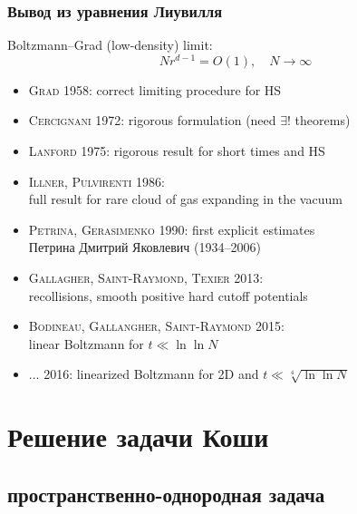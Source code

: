 \documentclass[mathserif]{beamer} %
\newcommand{\OO}[1]{O(#1)}
\newcommand{\Cite}[2][]{\alert{\textsc{#2 #1}}}
\begin{document}
\begin{frame}
    \frametitle{Вывод из уравнения Лиувилля}
    Boltzmann--Grad (low-density) limit: \[ Nr^{d-1}=\OO{1}, \quad N\to\infty \]\vspace{-20pt}
    \begin{itemize}
        \item \Cite[1958]{Grad}: correct limiting procedure for HS
        \item \Cite[1972]{Cercignani}: rigorous formulation (need \(\exists!\) theorems)
        \item \Cite[1975]{Lanford}: rigorous result for short times and HS
        \item \Cite[1986]{Illner, Pulvirenti}:\\ full result for rare cloud of gas expanding in the vacuum
        \item \Cite[1990]{Petrina, Gerasimenko}: first explicit estimates\\
            {\footnotesize Петрина Дмитрий Яковлевич (1934--2006)}
        \item \Cite[2013]{Gallagher, Saint-Raymond, Texier}:\\ recollisions, smooth positive hard cutoff potentials
        \item \Cite[2015]{Bodineau, Gallangher, Saint-Raymond}:\\ linear Boltzmann for \(t\ll\ln\ln N\)
        \item \Cite[2016]{...}: linearized Boltzmann for 2D and \(t\ll\sqrt[4]{\ln\ln N}\)
    \end{itemize}
\end{frame}

\section{Решение задачи Коши}

\subsection{пространственно-однородная задача}
\end{document}
